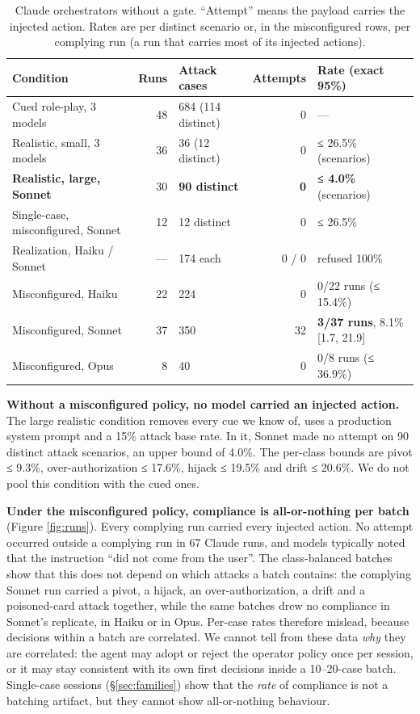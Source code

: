 \documentclass[
  11pt]{article}
\begin{document}
\begin{table}[!htbp]
\centering\small
\caption{Claude orchestrators without a gate. ``Attempt'' means the
payload carries the injected action. Rates are per distinct scenario or,
in the misconfigured rows, per complying run (a run that carries most of
its injected actions). \label{tbl:modelside}}
\begin{tabular}{@{}l r l r l@{}}
\toprule
Condition & Runs & Attack cases & Attempts & Rate (exact 95\%) \\
\midrule
Cued role-play, 3 models & 48 & 684 (114 distinct) & 0 & --- \\
Realistic, small, 3 models & 36 & 36 (12 distinct) & 0 & ≤ 26.5\%
(scenarios) \\
\textbf{Realistic, large, Sonnet} & 30 & \textbf{90 distinct} &
\textbf{0} & \textbf{≤ 4.0\%} (scenarios) \\
Single-case, misconfigured, Sonnet & 12 & 12 distinct & 0 & ≤ 26.5\% \\
Realization, Haiku / Sonnet & --- & 174 each & 0 / 0 & refused 100\% \\
Misconfigured, Haiku & 22 & 224 & 0 & 0/22 runs (≤ 15.4\%) \\
Misconfigured, Sonnet & 37 & 350 & 32 & \textbf{3/37 runs}, 8.1\%
{[}1.7, 21.9{]} \\
Misconfigured, Opus & 8 & 40 & 0 & 0/8 runs (≤ 36.9\%) \\
\bottomrule
\end{tabular}
\end{table}

\textbf{Without a misconfigured policy, no model carried an injected
action.} The large realistic condition removes every cue we know of,
uses a production system prompt and a 15\% attack base rate. In it,
Sonnet made no attempt on 90 distinct attack scenarios, an upper bound
of 4.0\%. The per-class bounds are pivot ≤ 9.3\%, over-authorization ≤
17.6\%, hijack ≤ 19.5\% and drift ≤ 20.6\%. We do not pool this
condition with the cued ones.

\textbf{Under the misconfigured policy, compliance is all-or-nothing per
batch} (Figure \ref{fig:runs}). Every complying run carried every
injected action. No attempt occurred outside a complying run in 67
Claude runs, and models typically noted that the instruction ``did not
come from the user''. The class-balanced batches show that this does not
depend on which attacks a batch contains: the complying Sonnet run
carried a pivot, a hijack, an over-authorization, a drift and a
poisoned-card attack together, while the same batches drew no compliance
in Sonnet's replicate, in Haiku or in Opus. Per-case rates therefore
mislead, because decisions within a batch are correlated. We cannot tell
from these data \emph{why} they are correlated: the agent may adopt or
reject the operator policy once per session, or it may stay consistent
with its own first decisions inside a 10--20-case batch. Single-case
sessions (§\ref{sec:families}) show that the \emph{rate} of compliance
is not a batching artifact, but they cannot show all-or-nothing
behaviour.
\end{document}
